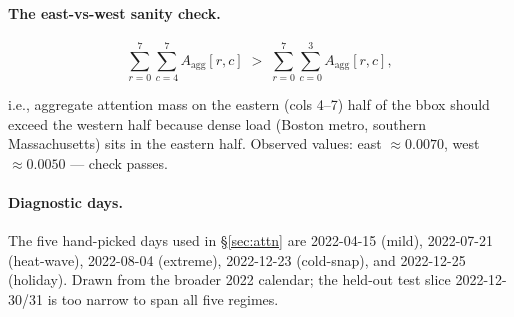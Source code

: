 \paragraph{The east-vs-west sanity check.}

\begin{equation}
\sum_{r=0}^{7} \sum_{c=4}^{7} A_{\text{agg}}[r, c]
\;>\;
\sum_{r=0}^{7} \sum_{c=0}^{3} A_{\text{agg}}[r, c],
\label{eq:sanity}
\end{equation}

i.e., aggregate attention mass on the eastern (cols 4--7) half of the bbox should exceed the western half because dense load (Boston metro, southern Massachusetts) sits in the eastern half. Observed values: east $\approx 0.0070$, west $\approx 0.0050$ --- check passes.

\paragraph{Diagnostic days.} The five hand-picked days used in \S\ref{sec:attn} are 2022-04-15 (mild), 2022-07-21 (heat-wave), 2022-08-04 (extreme), 2022-12-23 (cold-snap), and 2022-12-25 (holiday). Drawn from the broader 2022 calendar; the held-out test slice 2022-12-30/31 is too narrow to span all five regimes.
